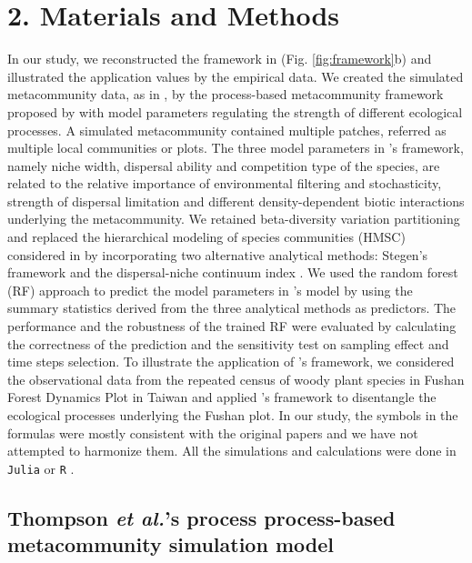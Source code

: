 \chapter*{2. Materials and Methods}
\setcounter{chapter}{2}
\noindent
In our study, we reconstructed the framework in \citet{guzman2022accounting} (Fig. \ref{fig:framework}b) and illustrated the application values by the empirical data. We created the simulated metacommunity data, as in \citet{guzman2022accounting}, by the process-based metacommunity framework proposed by \citet{thompson2020process} with model parameters regulating the strength of different ecological processes. A simulated metacommunity contained multiple patches, referred as multiple local communities or plots. The three model parameters in \citeauthor{thompson2020process}'s framework, namely niche width, dispersal ability and competition type of the species, are related to the relative importance of environmental filtering and stochasticity, strength of dispersal limitation and different density-dependent biotic interactions underlying the metacommunity. We retained beta-diversity variation partitioning and replaced the hierarchical modeling of species communities (HMSC) considered in \citet{guzman2022accounting} by incorporating two alternative analytical methods: Stegen's framework \citep{stegen2013quantifying} and the dispersal-niche continuum index \citep{vilmi2021dispersal}. We used the random forest (RF) approach to predict the model parameters in \citeauthor{thompson2020process}'s model by using the summary statistics derived from the three analytical methods as predictors. The performance and the robustness of the trained RF were evaluated by calculating the correctness of the prediction and the sensitivity test on sampling effect and time steps selection. To illustrate the application of \citeauthor{guzman2022accounting}'s framework, we considered the observational data from the repeated census of woody plant species in Fushan Forest Dynamics Plot in Taiwan and applied \citeauthor{guzman2022accounting}'s framework to disentangle the ecological processes underlying the Fushan plot. In our study, the symbols in the formulas were mostly consistent with the original papers and we have not attempted to harmonize them. All the simulations and calculations were done in \texttt{Julia} \citep{bezanson2017julia} or \texttt{R} \citep{R}.


\section{Thompson \textit{et al.}'s process process-based metacommunity simulation model}
\label{sec:thom}

